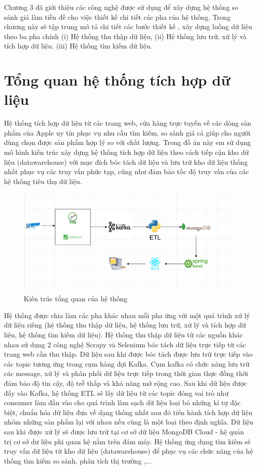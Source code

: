 \documentclass[../DoAn.tex]{subfiles}
\begin{document}
Chương 3 đã giới thiệu các công nghệ được sử dụng để xây dựng hệ thống so sánh giá làm tiền đề cho việc thiết kế chi tiết các pha của hệ thống. Trong chương này sẽ tập trung mô tả chi tiết các bước thiết kế , xây dựng luồng dữ liệu theo ba pha chính (i) Hệ thống thu thập dữ liệu, (ii) Hệ thống lưu trữ, xử lý và tích hợp dữ liệu. (iii) Hệ thống tìm kiếm dữ liệu.
\section{Tổng quan hệ thống tích hợp dữ liệu}

Hệ thống tích hợp dữ liệu từ các trang web, cửa hàng trực tuyến về các dòng sản phẩm của Apple uy tín phục vụ nhu cầu tìm kiếm, so sánh giá cả giúp cho người dùng chọn được sản phẩm hợp lý so với chất lượng. Trong đồ án này em sử dụng mô hình kiến trúc xây dựng hệ thống tích hợp dữ liệu theo cách tiếp cận kho dữ liệu (datawarehouse) với mục đích bóc tách dữ liệu và lưu trữ kho dữ liệu thống nhất phục vụ các truy vấn phức tạp, cũng như đảm bảo tốc độ truy vấn của các hệ thống tiêu thụ dữ liệu.

\begin{figure}[H]
    \centering
    \includegraphics[scale=0.33]{Hinhve/architecture_system.png}
    \caption{Kiến trúc tổng quan của hệ thống}
    \label{fig:my_label2}
\end{figure}

Hệ thống được chia làm các pha khác nhau mỗi pha ứng với một quá trình xử lý dữ liệu riêng (hệ thống thu thập dữ liệu, hệ thống lưu trữ, xử lý và tích hợp dữ liệu, hệ thống tìm kiếm dữ liệu). Hệ thống thu thập dữ liệu từ các nguồn khác nhau sử dụng 2 công nghệ Scrapy và Selenium bóc tách dữ liệu trực tiếp từ các trang web cần thu thập. Dữ liệu sau khi được bóc tách được lưu trữ trực tiếp vào các topic tương ứng trong cụm hàng đợi Kafka. Cụm kafka có chức năng lưu trữ các message, xử lý và phân phối dữ liệu trực tiếp trong thời gian thực đồng thời đảm bảo độ tin cậy, độ trễ thấp và khả năng mở rộng cao. Sau khi dữ liệu được đẩy vào Kafka, hệ thống ETL sẽ lấy dữ liệu từ các topic đóng vai trò như consumer làm đầu vào cho quá trình làm sạch dữ liệu loại bỏ những kí tự đặc biệt, chuẩn hóa dữ liệu đưa về dạng thống nhất sau đó tiến hành tích hợp dữ liệu nhóm những sản phẩm lại với nhau nếu cùng là một loại theo định nghĩa. Dữ liệu sau khi được xử lý sẽ được lưu trữ tại cơ sở dữ liệu MongoDB Cloud - hệ quản trị cơ sở dư liệu phi quan hệ nằm trên đám mây. Hệ thống ứng dụng tìm kiếm sẽ truy vấn dữ liệu từ kho dữ liệu (datawarehouse) để phục vụ các chức năng của hệ thống tìm kiếm so sánh, phân tích thị trường ,...
\end{document}
